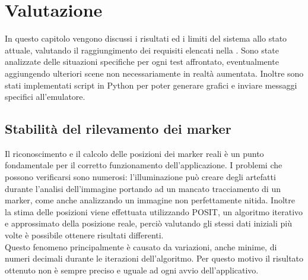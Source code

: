 \documentclass[12pt,a4paper,openright,oneside]{book}
\begin{document}
\chapter{Valutazione}\label{chap:valutazione} %
In questo capitolo vengono discussi i risultati ed i limiti del sistema allo stato attuale, valutando il raggiungimento dei requisiti elencati nella .
Sono state analizzate delle situazioni specifiche per ogni test affrontato, eventualmente aggiungendo ulteriori scene non necessariamente in realtà aumentata. Inoltre sono stati implementati script in Python per poter generare grafici e inviare messaggi specifici all'emulatore.
%
\section{Stabilità del rilevamento dei marker}\label{sec:stabilita_del_rilevamento_dei_marker} %
Il riconoscimento e il calcolo delle posizioni dei marker reali è un punto fondamentale per il corretto funzionamento dell'applicazione. I problemi che possono verificarsi sono numerosi: l'illuminazione può creare degli artefatti durante l'analisi dell'immagine portando ad un mancato tracciamento di un marker, come anche analizzando un immagine non perfettamente nitida.
Inoltre la stima delle posizioni viene effettuata utilizzando POSIT, un algoritmo iterativo e approssimato della posizione reale, perciò valutando gli stessi dati iniziali più volte è possibile ottenere risultati differenti.
\\
Questo fenomeno principalmente è causato da variazioni, anche minime, di numeri decimali durante le iterazioni dell'algoritmo.
Per questo motivo il risultato ottenuto non è sempre preciso e uguale ad ogni avvio dell'applicativo.
%
\end{document}
